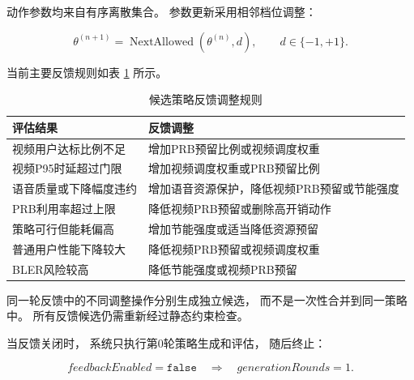 \documentclass[lang=cn,12pt]{elegantbook}
\begin{document}
动作参数均来自有序离散集合。
参数更新采用相邻档位调整：

\begin{equation}
\theta^{(n+1)}
=
\operatorname{NextAllowed}
\left(
\theta^{(n)},
d
\right),
\qquad
d\in\{-1,+1\}.
\label{eq:adjacent_parameter_reduced}
\end{equation}

当前主要反馈规则如表
\ref{tab:feedback_rules_reduced}
所示。

\begin{table}[H]
    \centering
    \caption{候选策略反馈调整规则}
    \label{tab:feedback_rules_reduced}
    \small
    \renewcommand{\arraystretch}{1.25}
    \begin{tabularx}{\textwidth}{
        >{\raggedright\arraybackslash}p{}
        >{\raggedright\arraybackslash}X
    }
        \toprule
        评估结果 & 反馈调整 \\
        \midrule

        视频用户达标比例不足
        & 增加PRB预留比例或视频调度权重
        \\

        视频P95时延超过门限
        & 增加视频调度权重或PRB预留比例
        \\

        语音质量或下降幅度违约
        & 增加语音资源保护，降低视频PRB预留或节能强度
        \\

        PRB利用率超过上限
        & 降低视频PRB预留或删除高开销动作
        \\

        策略可行但能耗偏高
        & 增加节能强度或适当降低资源预留
        \\

        普通用户性能下降较大
        & 降低视频PRB预留或视频调度权重
        \\

        BLER风险较高
        & 降低节能强度或视频PRB预留
        \\

        \bottomrule
    \end{tabularx}
\end{table}

同一轮反馈中的不同调整操作分别生成独立候选，
而不是一次性合并到同一策略中。
所有反馈候选仍需重新经过静态约束检查。

当反馈关闭时，
系统只执行第0轮策略生成和评估，
随后终止：

\begin{equation}
feedbackEnabled
=
\texttt{false}
\quad\Longrightarrow\quad
generationRounds=1.
\label{eq:feedback_disabled_reduced}
\end{equation}
\end{document}
